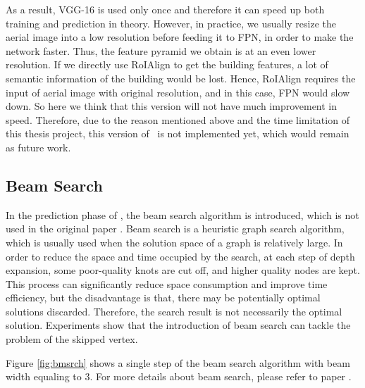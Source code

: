

As a result, VGG-16 is used only once and therefore it can speed up both training and prediction in theory. However, in practice, we usually resize the aerial image into a low resolution before feeding it to FPN, in order to make the network faster. Thus, the feature pyramid we obtain is at an even lower resolution. If we directly use RoIAlign to get the building features, a lot of semantic information of the building would be lost. Hence, RoIAlign requires the input of aerial image with original resolution, and in this case, FPN would slow down. So here we think that this version will not have much improvement in speed. Therefore, due to the reason mentioned above and the time limitation of this thesis project, this version of \modelnameshort\ is not implemented yet, which would remain as future work. 

\subsection{Beam Search}\label{bmsrch}
In the prediction phase of \modelnameshort, the beam search algorithm is introduced, which is not used in the original paper \cite{polygonrnn}. Beam search is a heuristic graph search algorithm, which is usually used when the solution space of a graph is relatively large. In order to reduce the space and time occupied by the search, at each step of depth expansion, some poor-quality knots are cut off, and higher quality nodes are kept. This process can significantly reduce space consumption and improve time efficiency, but the disadvantage is that, there may be potentially optimal solutions discarded. Therefore, the search result is not necessarily the optimal solution. Experiments show that the introduction of beam search can tackle the problem of the skipped vertex.

Figure \ref{fig:bmsrch} shows a single step of the beam search algorithm with beam width equaling to 3. For more details about beam search, please refer to paper \cite{seq2seq}.





